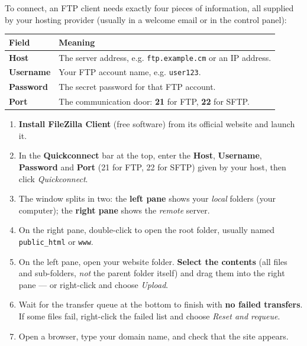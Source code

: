 \documentclass[11pt]{article}
\begin{document}
To connect, an FTP client needs exactly four pieces of information, all supplied by your hosting provider (usually in a welcome email or in the control panel):

\begin{center}
\begin{tabularx}{\linewidth}{|l|X|}\hline
\rowcolor{popblueL} \textbf{Field} & \textbf{Meaning} \\ \hline
\textbf{Host} & The server address, e.g. \texttt{ftp.example.cm} or an IP address. \\ \hline
\textbf{Username} & Your FTP account name, e.g. \texttt{user123}. \\ \hline
\textbf{Password} & The secret password for that FTP account. \\ \hline
\textbf{Port} & The communication door: \textbf{21} for FTP, \textbf{22} for SFTP. \\ \hline
\end{tabularx}
\end{center}

\begin{methode}
\begin{enumerate}
\item \textbf{Install FileZilla Client} (free software) from its official website and launch it.
\item In the \textbf{Quickconnect} bar at the top, enter the \textbf{Host}, \textbf{Username}, \textbf{Password} and \textbf{Port} (21 for FTP, 22 for SFTP) given by your host, then click \emph{Quickconnect}.
\item The window splits in two: the \textbf{left pane} shows your \emph{local} folders (your computer); the \textbf{right pane} shows the \emph{remote} server.
\item On the right pane, double-click to open the root folder, usually named \texttt{public\_html} or \texttt{www}.
\item On the left pane, open your website folder. \textbf{Select the contents} (all files and sub-folders, \emph{not} the parent folder itself) and drag them into the right pane — or right-click and choose \emph{Upload}.
\item Wait for the transfer queue at the bottom to finish with \textbf{no failed transfers}. If some files fail, right-click the failed list and choose \emph{Reset and requeue}.
\item Open a browser, type your domain name, and check that the site appears.
\end{enumerate}
\end{methode}
\end{document}
